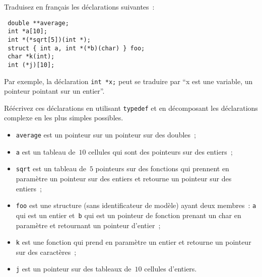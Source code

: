 Traduisez en fran\c{c}ais les d\'eclarations suivantes~:
\begin{verbatim}
 double **average;
 int *a[10];
 int *(*sqrt[5])(int *);
 struct { int a, int *(*b)(char) } foo;
 char *k(int);
 int (*j)[10]; 
\end{verbatim}
Par exemple, la d\'eclaration \verb+int *x;+ peut se traduire par ``x est
une variable, un pointeur pointant sur un entier''.
\item R\'e\'ecrivez ces d\'eclarations en utilisant \verb+typedef+ et en d\'ecomposant
les d\'eclarations complexe en les plus simples possibles.
\ifcorrection 
\begin{itemize}
\item \verb+average+ est un pointeur sur un pointeur sur des doubles~;
\item \verb+a+ est un tableau de~$10$ cellules qui sont des pointeurs
  sur des entiers~;
\item \verb+sqrt+ est un tableau de~$5$ pointeurs sur des fonctions
  qui prennent en param\`etre un pointeur sur des entiers et retourne
  un pointeur sur des entiers~;
\item \verb+foo+ est une structure (sans identificateur de mod\`ele) ayant deux membres~: \verb+a+ qui est un entier et~\verb+b+ qui est un pointeur de fonction prenant un char en param\`etre et retournant un pointeur d'entier~;
\item \verb+k+ est une fonction qui prend en param\`etre un entier et
  retourne un pointeur sur des caract\`eres~;
\item \verb+j+ est un pointeur sur des tableaux de~$10$ cellules d'entiers.
\end{itemize}
\fi

